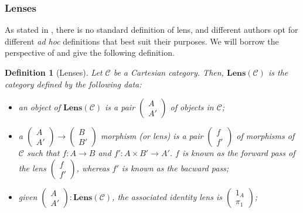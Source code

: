 \documentclass[12pt,a4paper,openright,twoside]{report}
\theoremstyle{plain}
\newtheorem{definition}[proposition]{Definition}
\theoremstyle{definition}
\begin{document}
\subsubsection{Lenses}

As stated in \cite{gavranovic2024fundamental}, there is no standard definition of lens, and different authors opt for different \textit{ad hoc} definitions that best suit their purposes. We will borrow the perspective of \cite{cruttwell2022categorical} and give the following definition.


\begin{definition}[Lenses]
  \label{def: lenses}
  Let $\mathcal{C}$ be a Cartesian category. Then, $\mathbf{Lens}(\mathcal{C})$ is the category defined by the following data:
  \begin{itemize}
    \item an object of $\mathbf{Lens}(\mathcal{C})$ is a pair $\left(\begin{smallmatrix} A \\ A' \end{smallmatrix}\right)$ of objects in $\mathcal{C}$; 
    
    \item a $\left(\begin{smallmatrix} A \\ A' \end{smallmatrix}\right) \to \left(\begin{smallmatrix} B \\ B' \end{smallmatrix}\right)$ morphism (or lens) is a pair $\left(\begin{smallmatrix} f \\ f' \end{smallmatrix}\right)$ of morphisms of $\mathcal{C}$ such that $f: A \to B$ and $f': A \times B' \to A'$. $f$ is known as the forward pass of the lens $\left(\begin{smallmatrix} f \\ f' \end{smallmatrix}\right)$, whereas $f'$ is known as the bacward pass;
    
    \item given $\left(\begin{smallmatrix} A \\ A' \end{smallmatrix}\right) : \mathbf{Lens}(\mathcal{C})$, the associated identity lens is $\left(\begin{smallmatrix} 1_A \\ \pi_1 \end{smallmatrix}\right)$;
    

\end{itemize}
\end{definition}
\end{document}
